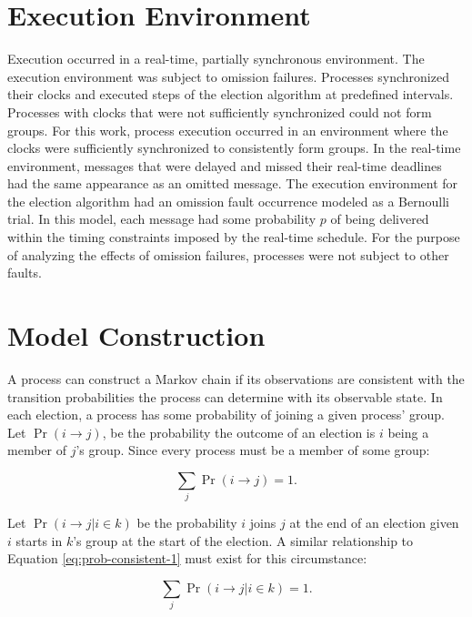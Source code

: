 \section{Execution Environment}

Execution occurred in a real-time, partially synchronous environment.
The execution environment was subject to omission failures.
Processes synchronized their clocks and executed steps of the election algorithm at predefined intervals.
Processes with clocks that were not sufficiently synchronized could not form groups.
For this work, process execution occurred in an environment where the clocks were sufficiently synchronized to consistently form groups.
In the real-time environment, messages that were delayed and missed their real-time deadlines had the same appearance as an omitted message.
The execution environment for the election algorithm had an omission fault occurrence modeled as a Bernoulli trial.
In this model, each message had some probability $p$ of being delivered within the timing constraints imposed by the real-time schedule.
For the purpose of analyzing the effects of omission failures, processes were not subject to other faults.

\section{Model Construction}

A process can construct a Markov chain if its observations are consistent with the transition probabilities the process can determine with its observable state.
In each election, a process has some probability of joining a given process' group.
Let $\Pr(i \rightarrow j)$, be the probability the outcome of an election is $i$ being a member of $j$'s group.
Since every process must be a member of some group:

\begin{equation}
\sum_{j} \Pr(i \rightarrow j) = 1.
\label{eq:prob-consistent-1}
\end{equation}

Let $\Pr(i \rightarrow j | i \in k)$ be the probability $i$ joins $j$ at the end of an election given $i$ starts in $k$'s group at the start of the election.
A similar relationship to Equation \ref{eq:prob-consistent-1} must exist for this circumstance:

\begin{equation}
\sum_{j} \Pr(i \rightarrow j | i \in k) = 1.
\label{eq:prob-consistent-2}
\end{equation}

